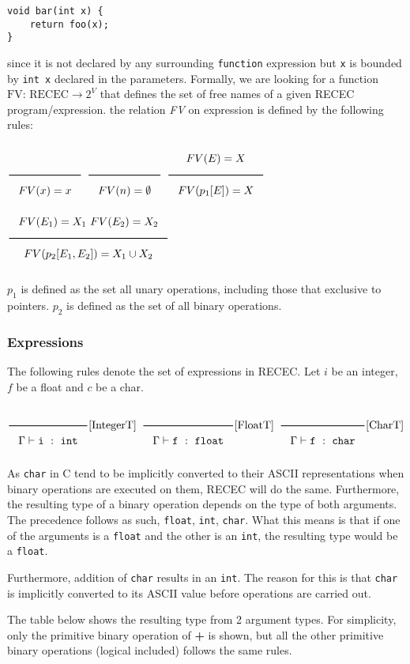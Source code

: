\documentclass[a4paper]{article}
\newcommand{\Rule}[2]{\genfrac{}{}{0.7pt}{}{{\setlength{\fboxrule}{0pt}\setlength{\fboxsep}{3mm}\fbox{$#1$}}}{{\setlength{\fboxrule}{0pt}\setlength{\fboxsep}{3mm}\fbox{$#2$}}}}
\newcommand{\RuleWithName}[3]{\genfrac{}{}{0.7pt}{}{{\setlength{\fboxrule}{0pt}\setlength{\fboxsep}{3mm}\fbox{$#1$}}}{{\setlength{\fboxrule}{0pt}\setlength{\fboxsep}{3mm}\fbox{$#2$}}}[\text{#3}]}
\newcommand{\Int}{\texttt{int}}
\newcommand{\Float}{\texttt{float}}
\newcommand{\Char}{\texttt{char}}
\begin{document}
\begin{verbatim}
void bar(int x) {
	return foo(x);
}
\end{verbatim}

since it is not declared by any surrounding \texttt{function} expression but \texttt{x} is bounded by \texttt{int x} declared in the parameters. Formally, we are looking for a function $\text{FV: RECEC} \rightarrow 2^V$ that defines the set of free names of a given RECEC program/expression. the relation \textit{FV} on expression is defined by the following rules:

$\Rule{}{FV(x) = {x}}$
\hfill
$\Rule{}{FV(n) = \emptyset}$
\hfill
$\Rule{FV(E) = X}{FV(p_1[E]) = X}$
\hfill
$\Rule{FV(E_1) = X_1 \ FV(E_2) = X_2}{FV(p_2[E_1,E_2]) = X_1 \cup X_2}$

$p_1$ is defined as the set all unary operations, including those that exclusive to pointers. $p_2$ is defined as the set of all binary operations.

\subsubsection{Expressions}
The following rules denote the set of expressions in RECEC. Let $i$ be an integer, $f$ be a float and $c$ be a char.

$\RuleWithName{}{\Gamma \vdash \texttt{i}\ :\ \Int}{IntegerT}$
\hfill
$\RuleWithName{}{\Gamma \vdash \texttt{f}\ :\ \Float}{FloatT}$
\hfill
$\RuleWithName{}{\Gamma \vdash \texttt{f}\ :\ \Char}{CharT}$

As \texttt{char} in C tend to be implicitly converted to their ASCII representations when binary operations are executed on them, RECEC will do the same. Furthermore, the resulting type of a binary operation depends on the type of both arguments. The precedence follows as such, \texttt{float}, \texttt{int}, \texttt{char}. What this means is that if one of the arguments is a \texttt{float} and the other is an \texttt{int}, the resulting type would be a \texttt{float}. 

Furthermore, addition of \texttt{char} results in an \texttt{int}. The reason for this is that \texttt{char} is implicitly converted to its ASCII value before operations are carried out.


The table below shows the resulting type from 2 argument types. For simplicity, only the primitive binary operation of \textbf{+} is shown, but all the other primitive binary operations (logical included) follows the same rules.
\end{document}
